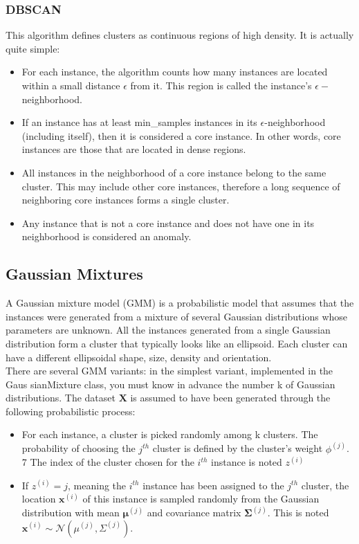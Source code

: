 \documentclass[french]{article}
\begin{document}
\subsubsection{DBSCAN}

This algorithm defines clusters as continuous regions of high density. It is actually quite simple:

\begin{itemize}
    \item For each instance, the algorithm counts how many instances are located within a small distance $\epsilon$ from it. This region is called the instance’s $\epsilon -$ neighborhood.
    \item If an instance has at least min\_samples instances in its $\epsilon$-neighborhood (including itself), then it is considered a core instance. In other words, core instances are those that are located in dense regions.
    \item All instances in the neighborhood of a core instance belong to the same cluster.  This may include other core instances, therefore a long sequence of neighboring core instances forms a single cluster.
    \item Any instance that is not a core instance and does not have one in its neighborhood is considered an anomaly.
\end{itemize}

\subsection{Gaussian Mixtures}

A Gaussian mixture model (GMM) is a probabilistic model that assumes that the instances were generated from a mixture of several Gaussian distributions whose parameters are unknown. All the instances generated from a single Gaussian distribution form a cluster that typically looks like an ellipsoid. Each cluster can have a different ellipsoidal shape, size, density and orientation.\\

There are several GMM variants: in the simplest variant, implemented in the Gaus sianMixture class, you must know in advance the number k of Gaussian distributions. The dataset $\bm{X}$ is assumed to have been generated through the following probabilistic process:

\begin{itemize}
    \item For each instance, a cluster is picked randomly among k clusters. The probability of choosing the $j^{th}$ cluster is defined by the cluster’s weight $\phi^{(j)}$. 7 The index of the cluster chosen for the $i^{th}$ instance is noted $z^{(i)}$
    \item If $z^{(i)} = j$, meaning the $i^{th}$ instance has been assigned to the $j^{th}$ cluster, the location
$\bm{x}^{(i)}$ of this instance is sampled randomly from the Gaussian distribution with
mean $\bm{\mu}^{(j)}$ and covariance matrix $\bm{\Sigma}^{(j)}$. This is noted $\bm{x}^{(i)} \sim \mathscr{N}(\mu^{(j)}, \Sigma^{(j)})$.
\end{itemize}
\end{document}
